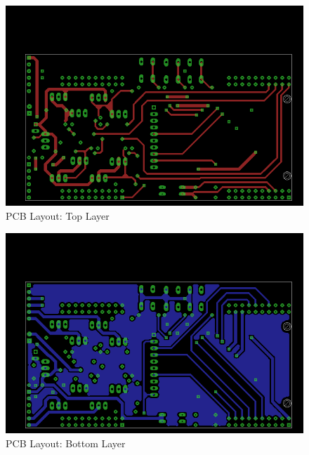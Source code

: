 \documentclass{article}
\begin{document}
	\begin{figure}[h]
		\includegraphics[keepaspectratio, width = \textwidth]{Lab7Graphics/PCB_Top}
		\caption{PCB Layout: Top Layer}
		\label{fig:PCB_Top}
	\end{figure}
	
	\begin{figure}[h]
		\includegraphics[keepaspectratio, width = \textwidth]{Lab7Graphics/PCB_Bottom}
		\caption{PCB Layout: Bottom Layer}
		\label{fig:PCB_Bottom}
	\end{figure}
	
\end{document}
